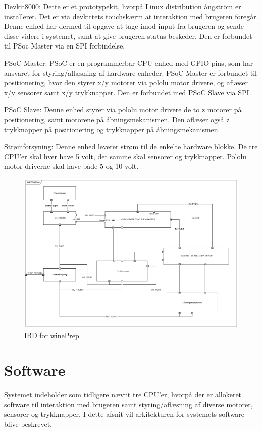 Devkit8000: 
Dette er et prototypekit, hvorpå Linux distribution ångström er installeret. Det er via devkittets touchskærm at interaktion med brugeren foregår. 
Denne enhed har dermed til opgave at tage imod input fra brugeren og sende disse videre i systemet, samt at give brugeren status beskeder. Den er forbundet til
PSoc Master via en SPI forbindelse.

PSoC Master:
PSoC er en programmerbar CPU enhed med GPIO pins, som har ansvaret for styring/aflæsning af hardware enheder. PSoC Master er forbundet til positionering, 
hvor den styrer x/y motorer via pololu motor drivere, og aflæser x/y sensorer samt x/y trykknapper. Den er forbundet med PSoC Slave via SPI.  

PSoC Slave:
Denne enhed styrer via pololu motor drivere de to z motorer på positionering, samt motorene på åbningsmekanismen. Den aflæser også z trykknapper på 
positionering og trykknapper på åbningsmekanismen.  

Strømforsyning:
Denne enhed leverer strøm til de enkelte hardware blokke. De tre CPU'er skal hver have 5 volt, det samme skal sensorer og trykknapper. Pololu motor driverne 
skal have både 5 og 10 volt. 

\begin{figure}[H]
\includegraphics[scale=0.8]{Hardware/IBD_winePrep}
\caption{IBD for winePrep}
\end{figure}


\section{Software}

Systemet indeholder som tidligere nævnt tre CPU'er, hvorpå der er allokeret software til interaktion med brugeren samt styring/aflæsning af diverse 
motorer, sensorer og trykknapper. I dette afsnit vil arkitekturen for systemets software blive beskrevet. 

